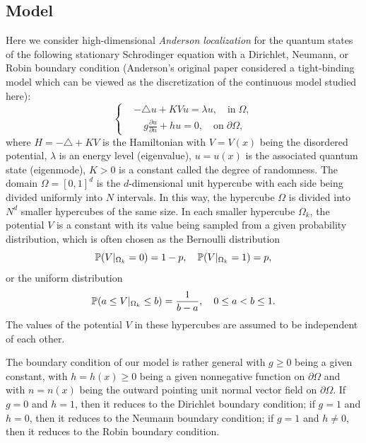 \documentclass[a4paper,11pt]{article}
\begin{document}
\subsection{Model}

Here we consider high-dimensional \emph{Anderson localization} for the quantum states of the following stationary Schrodinger equation with a Dirichlet, Neumann, or Robin boundary condition (Anderson's original paper \cite{chen2004markov} considered a tight-binding model which can be viewed as the discretization of the continuous model studied here):
\begin{equation}\label{anderson}
\left\{
\begin{split}
& -\triangle u + K V u = \lambda u, \quad \textrm{in} \; \Omega, \\
& \quad g \frac{\partial u}{\partial n} + h u = 0, \quad \textrm{on} \; \partial  \Omega,
\end{split}
\right.
\end{equation}
where $H = -\triangle + K V$ is the Hamiltonian with $V = V(x)$ being the disordered potential, $\lambda$ is an energy level (eigenvalue), $u = u(x)$ is the associated quantum state (eigenmode), $K > 0$ is a constant called the degree of randomness. The domain $\Omega = [0,1]^d$ is the $d$-dimensional unit hypercube with each side being divided uniformly into $N$ intervals. In this way, the hypercube $\Omega$ is divided into $N^d$ smaller hypercubes of the same size. In each smaller hypercube $\Omega_k$, the potential $V$ is a constant with its value being sampled from a given probability distribution, which is often chosen as the Bernoulli distribution
\begin{equation}\label{bernoulli}
\mathbb{P}(V|_{\Omega_k} = 0) = 1-p, \quad \mathbb{P}(V|_{\Omega_k} = 1) = p,
\end{equation}
or the uniform distribution
\begin{equation}\label{uniform}
\mathbb{P}(a \leq V|_{\Omega_k} \leq b) = \frac{1}{b-a}, \quad 0 \leq a < b \leq 1.
\end{equation}
The values of the potential $V$ in these hypercubes are assumed to be independent of each other.

The boundary condition of our model is rather general with $g \geq 0$ being a given constant, with $h = h(x) \geq 0$ being a given nonnegative function on $\partial \Omega$ and with $n = n(x)$ being the outward pointing unit normal vector field on $\partial \Omega$. If $g = 0$ and $h = 1$, then it reduces to the Dirichlet boundary condition; if $g = 1$ and $h = 0$, then it reduces to the Neumann boundary condition; if $g = 1$ and $h \neq 0$, then it reduces to the Robin boundary condition.
\end{document}
